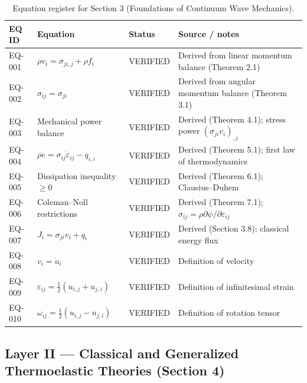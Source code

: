 \begin{table}[h]
\centering
\small
\caption{Equation register for Section 3 (Foundations of Continuum Wave Mechanics).}
\label{tab:appA-sec3}
\begin{tabularx}{\textwidth}{@{}lXll@{}}
\toprule
\textbf{EQ ID} & \textbf{Equation} & \textbf{Status} & \textbf{Source / notes} \\
\midrule
EQ-001 & $\rho \dot{v}_i = \sigma_{ji,j} + \rho f_i$ & VERIFIED & Derived from linear momentum balance (Theorem 2.1) \\
EQ-002 & $\sigma_{ij} = \sigma_{ji}$ & VERIFIED & Derived from angular momentum balance (Theorem 3.1) \\
EQ-003 & Mechanical power balance & VERIFIED & Derived (Theorem 4.1); stress power $(\sigma_{ji}v_i)_{,j}$ \\
EQ-004 & $\rho \dot{e} = \sigma_{ij}\dot{\varepsilon}_{ij} - q_{i,i}$ & VERIFIED & Derived (Theorem 5.1); first law of thermodynamics \\
EQ-005 & Dissipation inequality $\geq 0$ & VERIFIED & Derived (Theorem 6.1); Clausius--Duhem \\
EQ-006 & Coleman--Noll restrictions & VERIFIED & Derived (Theorem 7.1); $\sigma_{ij} = \rho \partial\psi/\partial\varepsilon_{ij}$ \\
EQ-007 & $J_i = \sigma_{ji}v_i + q_i$ & VERIFIED & Derived (Section 3.8); classical energy flux \\
EQ-008 & $v_i = \dot{u}_i$ & VERIFIED & Definition of velocity \\
EQ-009 & $\varepsilon_{ij} = \tfrac{1}{2}(u_{i,j} + u_{j,i})$ & VERIFIED & Definition of infinitesimal strain \\
EQ-010 & $\omega_{ij} = \tfrac{1}{2}(u_{i,j} - u_{j,i})$ & VERIFIED & Definition of rotation tensor \\
\bottomrule
\end{tabularx}
\end{table}

\subsection{Layer II — Classical and Generalized Thermoelastic Theories (Section 4)}

